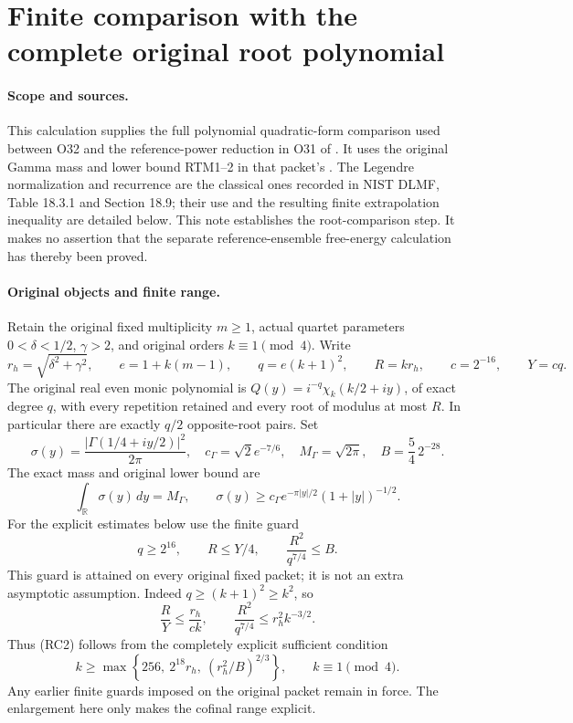\documentclass[11pt,a4paper]{article}
\begin{document}
\clearpage
\begingroup


\setcounter{equation}{0}
\renewcommand{\theequation}{RC.\arabic{equation}}
\section*{Finite comparison with the complete original root polynomial}






\paragraph{Scope and sources.}
This calculation supplies the full polynomial quadratic-form comparison
used between O32 and the reference-power reduction in O31 of
.
It uses the original Gamma mass and lower bound RTM1--2 in that packet's
.
The Legendre normalization and recurrence are the classical ones recorded
in NIST DLMF, Table 18.3.1 and Section 18.9; their use and the resulting
finite extrapolation inequality are detailed below.
This note establishes the root-comparison step. It makes no assertion
that the separate reference-ensemble free-energy calculation has thereby
been proved.

\paragraph{Original objects and finite range.}
Retain the original fixed multiplicity $m\geq1$, actual quartet parameters
$0<\delta<1/2$, $\gamma>2$, and original orders $k\equiv1\pmod4$.
Write
\[
 r_h=\sqrt{\delta^2+\gamma^2},\qquad
 e=1+k(m-1),\qquad q=e(k+1)^2,\qquad R=kr_h,\qquad
 c=2^{-16},\qquad Y=cq.
\]
The original real even monic polynomial is
$Q(y)=i^{-q}\chi_k(k/2+iy)$, of exact degree $q$, with every
repetition retained and every root of modulus at most $R$.
In particular there are exactly $q/2$ opposite-root pairs.
Set
\[
 \sigma(y)=\frac{|\Gamma(1/4+iy/2)|^2}{2\pi},\quad
 c_\Gamma=\sqrt2 e^{-7/6},\quad M_\Gamma=\sqrt{2\pi},\quad
 B=\frac54\,2^{-28}.
\]
The exact mass and original lower bound are
\[
 \int_{\mathbb R}\sigma(y)\,dy=M_\Gamma,\qquad
 \sigma(y)\geq c_\Gamma e^{-\pi|y|/2}(1+|y|)^{-1/2}.
 \tag{RC1}
\]
For the explicit estimates below use the finite guard
\[
 q\geq2^{16},\qquad R\leq Y/4,\qquad
 \frac{R^2}{q^{7/4}}\leq B.                         \tag{RC2}
\]
This guard is attained on every original fixed packet; it is not an
extra asymptotic assumption. Indeed $q\geq(k+1)^2\geq k^2$, so
\[
 \frac RY\leq\frac{r_h}{ck},\qquad
 \frac{R^2}{q^{7/4}}\leq r_h^2 k^{-3/2}.
\]
Thus (RC2) follows from the completely explicit sufficient condition
\[
 k\geq
 \max\left\{256,\ 2^{18}r_h,\
                 (r_h^2/B)^{2/3}\right\},
 \qquad k\equiv1\pmod4.                           \tag{RC3}
\]
Any earlier finite guards imposed on the original packet remain in force.
The enlargement here only makes the cofinal range explicit.
\end{document}
